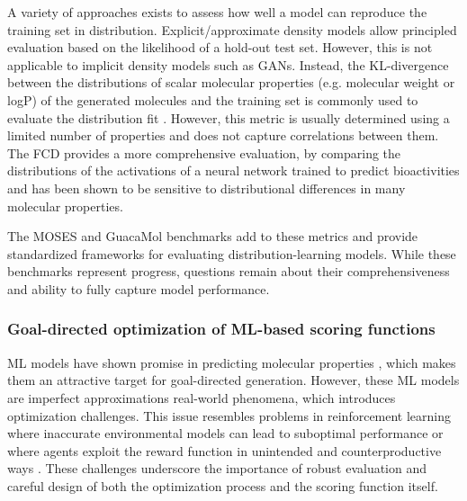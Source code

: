 A variety of approaches exists to assess how well a model can reproduce the training set in
distribution. Explicit/approximate density models allow principled evaluation based on the
likelihood of a hold-out test set. However, this is not applicable to implicit density models such
as \acp{GAN}. Instead, the KL-divergence between the distributions of scalar molecular properties
(e.g. molecular weight or logP) of the generated molecules and the training set is commonly used to
evaluate the distribution fit
\citep{brownGuacaMolBenchmarkingModels2019,polykovskiyMolecularSetsMOSES2020}. However, this metric
is usually determined using a limited number of properties and does not capture correlations between
them. The \ac{FCD} \citep{preuerFrechetChemNetDistance2018} provides a more comprehensive
evaluation, by comparing the distributions of the activations of a neural network trained to predict
bioactivities and has been shown to be sensitive to distributional differences in many molecular
properties.

The MOSES \citep{polykovskiyMolecularSetsMOSES2020} and GuacaMol
\citep{brownGuacaMolBenchmarkingModels2019} benchmarks add to these metrics and provide standardized
frameworks for evaluating distribution-learning models. While these benchmarks represent progress,
questions remain about their comprehensiveness and ability to fully capture model performance.

\subsubsection{Goal-directed optimization of ML-based scoring functions}
\ac{ML} models have shown promise in predicting molecular properties
\citep{mayrDeepToxToxicityPrediction2016,klambauerMachineLearningDrug2019,vamathevanApplicationsMachineLearning2019,chenRiseDeepLearning2018,stokesDeepLearningApproach2020},
which makes them an attractive target for goal-directed generation. However, these \ac{ML} models are imperfect
approximations real-world phenomena, which introduces optimization challenges. This issue resembles problems in
reinforcement learning \citep{suttonIntroductionReinforcementLearning1998} where inaccurate environmental models can
lead to suboptimal performance \citep{abbeelUsingInaccurateModels2006} or where agents exploit the reward function in
unintended and counterproductive ways \citep{lehmanSurprisingCreativityDigital2019}. These challenges underscore the
importance of robust evaluation and careful design of both the optimization process and the scoring function itself.

